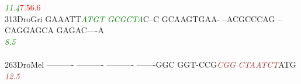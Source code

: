 \documentclass[11pt,twoside,reqno,a4paper]{article}
\begin{document}
{\hspace*{4\charwidth}\hspace*{7\charwidth}\hspace*{6\charwidth}\textit{\textcolor{green}{11.4}}\hspace*{1\charwidth}\hspace*{1\charwidth}\hspace*{11\charwidth}\textcolor{red}{7.5}\hspace*{1\charwidth}\hspace*{12\charwidth}\textcolor{red}{6.6}\hspace*{1\charwidth}\hspace*{1\charwidth}\hspace*{1\charwidth}\\
313\hspace*{1\charwidth}DroGri	GAAATT\textit{\textcolor{green}{A}}\textit{\textcolor{green}{T}}\textit{\textcolor{green}{G}}\textit{\textcolor{green}{T}}	\textit{\textcolor{green}{G}}\textit{\textcolor{green}{C}}\textit{\textcolor{green}{G}}\textit{\textcolor{green}{C}}\textit{\textcolor{green}{T}}\textit{\textcolor{green}{A}}C--C	GCAAGTGAA-	--ACGCCCAG	--CAGGAGCA	GAGAC----A	\\
\hspace*{4\charwidth}\hspace*{7\charwidth}\hspace*{6\charwidth}\textit{\textcolor{green}{8.5}}\hspace*{1\charwidth}\hspace*{1\charwidth}\hspace*{1\charwidth}\hspace*{1\charwidth}\hspace*{1\charwidth}\hspace*{1\charwidth}\\
\\
263\hspace*{1\charwidth}DroMel	----------	----------	----------	-------GGC	GGT-CCG\textit{\textcolor{brown}{C}}\textit{\textcolor{brown}{G}}\textit{\textcolor{brown}{G}}	\textit{\textcolor{brown}{C}}\textit{\textcolor{brown}{T}}\textit{\textcolor{brown}{A}}\textit{\textcolor{brown}{A}}\textit{\textcolor{brown}{T}}\textit{\textcolor{brown}{C}}\textit{\textcolor{brown}{T}}ATG	\\
\hspace*{4\charwidth}\hspace*{7\charwidth}\hspace*{1\charwidth}\hspace*{1\charwidth}\hspace*{1\charwidth}\hspace*{1\charwidth}\hspace*{47\charwidth}\textit{\textcolor{brown}{12.5}}\hspace*{1\charwidth}\hspace*{1\charwidth}\\
}
\end{document}
